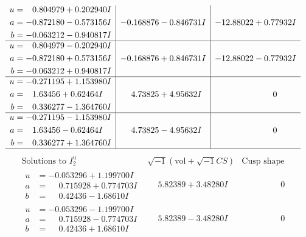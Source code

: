 \documentclass[1p]{elsarticle_modified}
\theoremstyle{definition}
\newcommand{\I}{\sqrt{-1}}
\begin{document}
$$\begin{array}{c|c|c}
\begin{aligned}
u &= \phantom{-}0.804979 + 0.202940 I \\
a &= -0.872180 - 0.573156 I \\
b &= -0.063212 - 0.940817 I\end{aligned}
 & -0.168876 - 0.846731 I & -12.88022 + 0.77932 I \\ \hline\begin{aligned}
u &= \phantom{-}0.804979 - 0.202940 I \\
a &= -0.872180 + 0.573156 I \\
b &= -0.063212 + 0.940817 I\end{aligned}
 & -0.168876 + 0.846731 I & -12.88022 - 0.77932 I \\ \hline\begin{aligned}
u &= -0.271195 + 1.153980 I \\
a &= \phantom{-}1.63456 + 0.62464 I \\
b &= \phantom{-}0.336277 - 1.364760 I\end{aligned}
 & \phantom{-}4.73825 + 4.95632 I & \phantom{-0.000000 } 0 \\ \hline\begin{aligned}
u &= -0.271195 - 1.153980 I \\
a &= \phantom{-}1.63456 - 0.62464 I \\
b &= \phantom{-}0.336277 + 1.364760 I\end{aligned}
 & \phantom{-}4.73825 - 4.95632 I & \phantom{-0.000000 } 0\\
 \hline 
 \end{array}$$\newpage$$\begin{array}{c|c|c}  
\text{Solutions to }I^u_{2}& \I (\text{vol} + \sqrt{-1}CS) & \text{Cusp shape}\\
 \hline 
\begin{aligned}
u &= -0.053296 + 1.199700 I \\
a &= \phantom{-}0.715928 + 0.774703 I \\
b &= \phantom{-}0.42436 - 1.68610 I\end{aligned}
 & \phantom{-}5.82389 + 3.48280 I & \phantom{-0.000000 } 0 \\ \hline\begin{aligned}
u &= -0.053296 - 1.199700 I \\
a &= \phantom{-}0.715928 - 0.774703 I \\
b &= \phantom{-}0.42436 + 1.68610 I\end{aligned}
 & \phantom{-}5.82389 - 3.48280 I & \phantom{-0.000000 } 0 \\ \hline\begin{aligned}

\end{aligned}
\end{array}$$
\end{document}
